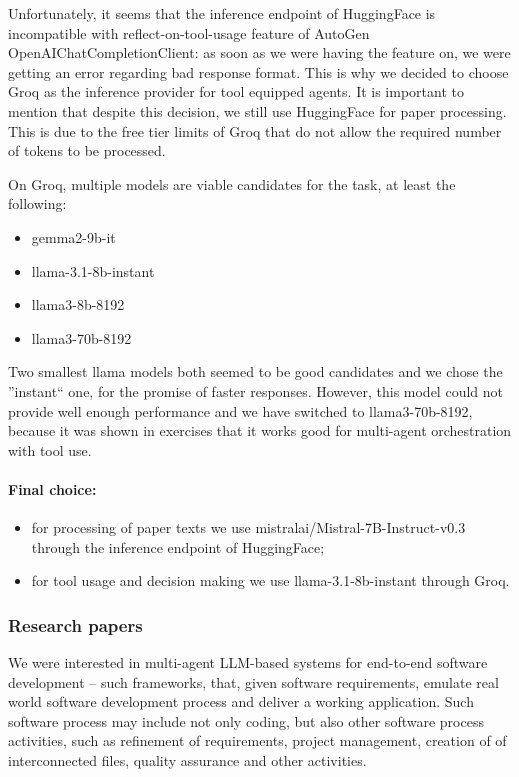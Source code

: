 Unfortunately, it seems that the inference endpoint of HuggingFace is incompatible with reflect-on-tool-usage feature of AutoGen OpenAIChatCompletionClient: as soon as we were having the feature on, we were getting an error regarding bad response format. This is why we decided to choose Groq as the inference provider for tool equipped agents. It is important to mention that despite this decision, we still use HuggingFace for paper processing. This is due to the free tier limits of Groq that do not allow the required number of tokens to be processed.

On Groq, multiple models are viable candidates for the task, at least the following:

\begin{itemize}
	\item gemma2-9b-it
	\item llama-3.1-8b-instant
	\item llama3-8b-8192
	\item llama3-70b-8192
\end{itemize}

Two smallest llama models both seemed to be good candidates and we chose the ''instant`` one, for the promise of faster responses. However, this model could not provide well enough performance and we have switched to llama3-70b-8192, because it was shown in exercises that it works good for multi-agent orchestration with tool use.

\paragraph{Final choice:}

\begin{itemize}
	\item for processing of paper texts we use mistralai/Mistral-7B-Instruct-v0.3 through the inference endpoint of HuggingFace;
	\item for tool usage and decision making we use llama-3.1-8b-instant through Groq.
\end{itemize}


\subsubsection{Research papers}

We were interested in multi-agent LLM-based systems for end-to-end software development -- such frameworks, that, given software requirements, emulate real world software development process and deliver a working application. Such software process  may include not only coding, but also other software process activities, such as refinement of requirements, project management, creation of of interconnected files, quality assurance and other activities. 


